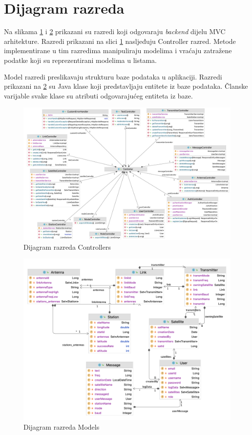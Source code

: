 			\eject
		\section{Dijagram razreda}
		{Na slikama \ref{fig:razredi_controllers} i \ref{fig:razredi_models} prikazani su razredi koji odgovaraju \textit{backend} dijelu MVC arhitekture. Razredi prikazani na slici \ref{fig:razredi_controllers} nasljeđuju Controller razred. Metode implementirane u tim razredima manipuliraju modelima i vraćaju zatražene podatke koji su reprezentirani modelima u listama.}
		
		
		{Model razredi preslikavaju strukturu baze podataka u aplikaciji. Razredi prikazani na \ref{fig:razredi_models} su Java klase koji predstavljaju entitete iz baze podataka. Članske varijable svake klase su atributi odgovarajućeg entiteta iz baze.}
		\begin{figure}[H]
			\includegraphics[width=\linewidth]{Diagram_razreda_kontrole.png}
			\caption{Dijagram razreda Controllers}
			\label{fig:razredi_controllers}
		\end{figure}
	
		\begin{figure}[H]
		\includegraphics[width=\linewidth]{Diagram_razreda_modela.png}
		\caption{Dijagram razreda Models}
	\label{fig:razredi_models}
\end{figure}


